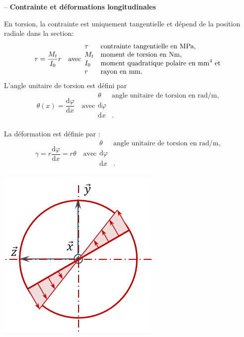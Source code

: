 \documentclass[10pt,fleqn]{article} %
\begin{document}
\begin{defi} -- 
\textbf{Contrainte et déformations longitudinales} ~\\
\begin{minipage}[c]{.7\linewidth}
En torsion, la contrainte est uniquement tangentielle et dépend de la position radiale dans la section: 
$$ \tau = \dfrac{M_t}{I_{0}}r
\quad 
\text{avec}
\begin{array}{ll}
\tau &\text{contrainte tangentielle en \text{MPa},}\\
M_t &\text{moment de torsion en Nm,} \\
I_{0} &\text{moment quadratique polaire en mm}^4 \text{ et} \\
r &\text{rayon en mm.}
\end{array}
$$
L'angle unitaire de torsion est défini par 
$$
\theta(x) = \dfrac{\text{d} \varphi}{\text{d} x} 
\quad 
\text{avec}
\begin{array}{ll}
\theta &\text{angle unitaire de torsion en rad/m,}\\
\text{d} \varphi &\text{} \\
\text{d} x &\text{.} \\
\end{array}
$$

La déformation est définie par : 
$$
\gamma = r \dfrac{\text{d} \varphi}{\text{d} x} = r\theta  
\quad 
\text{avec}
\begin{array}{ll}
\theta &\text{angle unitaire de torsion en rad/m,}\\
\text{d} \varphi &\text{} \\
\text{d} x &\text{.} \\
\end{array}
$$
\end{minipage} \hfill
\begin{minipage}[c]{.25\linewidth}
\begin{center}
\includegraphics[width=.9\linewidth]{images/contrainte_torsion}
\end{center}
\end{minipage}
\end{defi}
\end{document}
